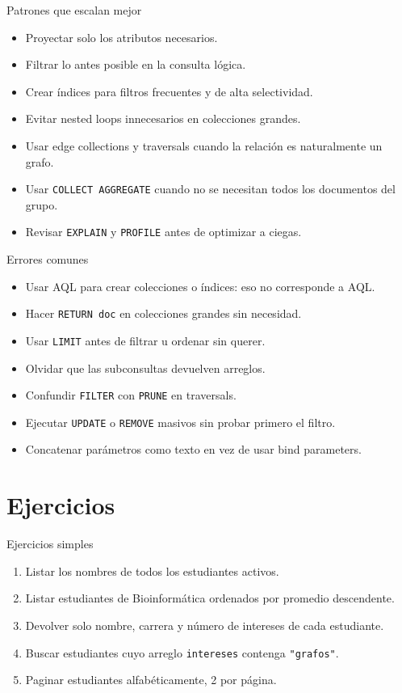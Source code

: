 \documentclass[aspectratio=169,11pt]{beamer}
\begin{document}
\begin{frame}{Patrones que escalan mejor}
\begin{itemize}
  \item Proyectar solo los atributos necesarios.
  \item Filtrar lo antes posible en la consulta lógica.
  \item Crear índices para filtros frecuentes y de alta selectividad.
  \item Evitar nested loops innecesarios en colecciones grandes.
  \item Usar edge collections y traversals cuando la relación es naturalmente un grafo.
  \item Usar \texttt{COLLECT AGGREGATE} cuando no se necesitan todos los documentos del grupo.
  \item Revisar \texttt{EXPLAIN} y \texttt{PROFILE} antes de optimizar a ciegas.
\end{itemize}
\end{frame}

\begin{frame}{Errores comunes}
\begin{itemize}
  \item Usar AQL para crear colecciones o índices: eso no corresponde a AQL.
  \item Hacer \texttt{RETURN doc} en colecciones grandes sin necesidad.
  \item Usar \texttt{LIMIT} antes de filtrar u ordenar sin querer.
  \item Olvidar que las subconsultas devuelven arreglos.
  \item Confundir \texttt{FILTER} con \texttt{PRUNE} en traversals.
  \item Ejecutar \texttt{UPDATE} o \texttt{REMOVE} masivos sin probar primero el filtro.
  \item Concatenar parámetros como texto en vez de usar bind parameters.
\end{itemize}
\end{frame}

\section{Ejercicios}

\begin{frame}{Ejercicios simples}
\begin{enumerate}
  \item Listar los nombres de todos los estudiantes activos.
  \item Listar estudiantes de Bioinformática ordenados por promedio descendente.
  \item Devolver solo nombre, carrera y número de intereses de cada estudiante.
  \item Buscar estudiantes cuyo arreglo \texttt{intereses} contenga \texttt{"grafos"}.
  \item Paginar estudiantes alfabéticamente, 2 por página.
\end{enumerate}
\end{frame}
\end{document}
